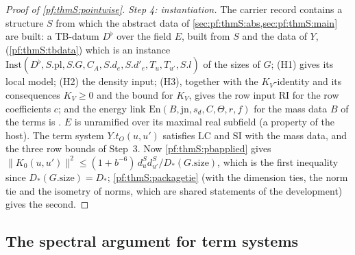 \begin{proof}[Proof of \cref{pf:thmS:pointwise}]
\emph{Step 4: instantiation.} The carrier record contains a
structure $S$ from which the abstract data of \cref{sec:pf:thmS:abs,sec:pf:thmS:main} are built: a TB-datum $D^\flat$ over the field $E$, built from $S$ and the data of $Y$, (\cref{pf:thmS:tbdata}) which is an instance
$\mathrm{Inst}(D^\flat,S.\mathrm{pl},S.G,C_A,S.d_e,S.d'_e,T_u,T_{u'},S.l)$ of the sizes of $G$; (H1) gives its local model; (H2) the density input; (H3), together with the $K_V$-identity and its consequences $K_V\ge0$ and the bound for $K_V$, gives the row input $\mathrm{RI}$ for the row coefficients $c$; and the energy link
$\mathrm{En}(B,\mathrm{jn},s_d,C,\Theta,r,f)$ for the mass data $B$ of the terms is
. $E$ is unramified over its maximal real subfield
(a property of the host). The term system $Y.t_O(u,u')$ satisfies $\mathrm{LC}$ and
$\mathrm{SI}$ with the mass data, and the three row bounds of Step~3. Now \cref{pf:thmS:pbapplied} gives
$\|K_0(u,u')\|^2\le(1+b^{-6})\,d^S_ud^S_{u'}/D_*(G.\mathrm{size})$, which is the first inequality since
$D_*(G.\mathrm{size})=D_*$; \cref{pf:thmS:packagetie} (with the dimension ties, the norm tie and the isometry of
norms, which are shared statements of the development) gives the second.
\end{proof}

\subsection{The spectral argument for term systems}\label{sec:pf:thmS:abs}

